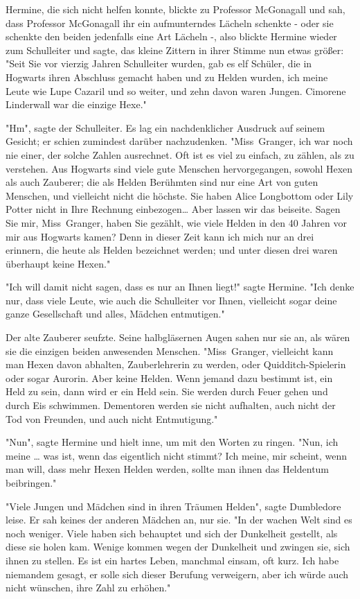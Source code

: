 {Hermine, die sich nicht helfen konnte, blickte zu Professor McGonagall und sah, dass Professor McGonagall ihr ein aufmunterndes Lächeln schenkte - oder sie schenkte den beiden jedenfalls eine Art Lächeln -, also blickte Hermine wieder zum Schulleiter und sagte, das kleine Zittern in ihrer Stimme nun etwas größer: "Seit Sie vor vierzig Jahren Schulleiter wurden, gab es elf Schüler, die in Hogwarts ihren Abschluss gemacht haben und zu Helden wurden, ich meine Leute wie Lupe Cazaril und so weiter, und zehn davon waren Jungen. Cimorene Linderwall war die einzige Hexe."

"Hm", sagte der Schulleiter. Es lag ein nachdenklicher Ausdruck auf seinem Gesicht; er schien zumindest darüber nachzudenken. "Miss~Granger, ich war noch nie einer, der solche Zahlen ausrechnet. Oft ist es viel zu einfach, zu zählen, als zu verstehen. Aus Hogwarts sind viele gute Menschen hervorgegangen, sowohl Hexen als auch Zauberer; die als Helden Berühmten sind nur eine Art von guten Menschen, und vielleicht nicht die höchste. Sie haben Alice Longbottom oder Lily Potter nicht in Ihre Rechnung einbezogen… Aber lassen wir das beiseite. Sagen Sie mir, Miss~Granger, haben Sie gezählt, wie viele Helden in den 40 Jahren vor mir aus Hogwarts kamen? Denn in dieser Zeit kann ich mich nur an drei erinnern, die heute als Helden bezeichnet werden; und unter diesen drei waren überhaupt keine Hexen."

"Ich will damit nicht sagen, dass es nur an Ihnen liegt!" sagte Hermine. "Ich denke nur, dass viele Leute, wie auch die Schulleiter vor Ihnen, vielleicht sogar deine ganze Gesellschaft und alles, Mädchen entmutigen."

Der alte Zauberer seufzte. Seine halbgläsernen Augen sahen nur sie an, als wären sie die einzigen beiden anwesenden Menschen. "Miss~Granger, vielleicht kann man Hexen davon abhalten, Zauberlehrerin zu werden, oder Quidditch-Spielerin oder sogar Aurorin. Aber keine Helden. Wenn jemand dazu bestimmt ist, ein Held zu sein, dann wird er ein Held sein. Sie werden durch Feuer gehen und durch Eis schwimmen. Dementoren werden sie nicht aufhalten, auch nicht der Tod von Freunden, und auch nicht Entmutigung."

"Nun", sagte Hermine und hielt inne, um mit den Worten zu ringen. "Nun, ich meine … was ist, wenn das eigentlich nicht stimmt? Ich meine, mir scheint, wenn man will, dass mehr Hexen Helden werden, sollte man ihnen das Heldentum beibringen."

"Viele Jungen und Mädchen sind in ihren Träumen Helden", sagte Dumbledore leise. Er sah keines der anderen Mädchen an, nur sie. "In der wachen Welt sind es noch weniger. Viele haben sich behauptet und sich der Dunkelheit gestellt, als diese sie holen kam. Wenige kommen wegen der Dunkelheit und zwingen sie, sich ihnen zu stellen. Es ist ein hartes Leben, manchmal einsam, oft kurz. Ich habe niemandem gesagt, er solle sich dieser Berufung verweigern, aber ich würde auch nicht wünschen, ihre Zahl zu erhöhen."

}
